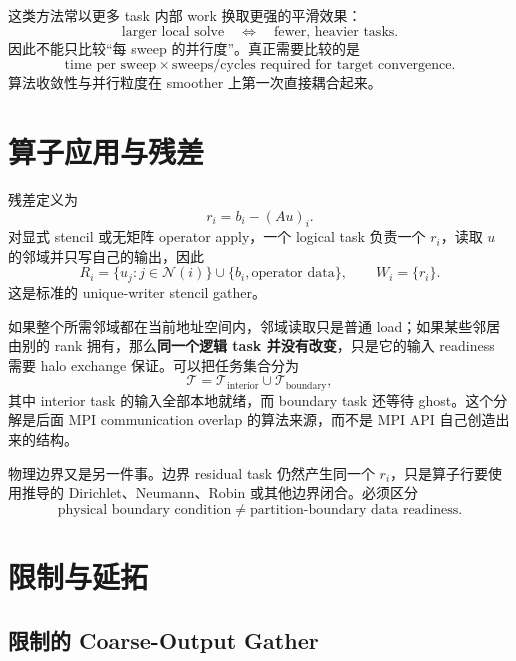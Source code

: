 这类方法常以更多 task 内部 work 换取更强的平滑效果：
\begin{equation}
\text{larger local solve}
\quad\Longleftrightarrow\quad
\text{fewer, heavier tasks}.
\end{equation}
因此不能只比较“每 sweep 的并行度”。真正需要比较的是
\begin{equation}
\boxed{
\text{time per sweep}
\times
\text{sweeps/cycles required for target convergence}.
}
\end{equation}
算法收敛性与并行粒度在 smoother 上第一次直接耦合起来。

\section{算子应用与残差}

残差定义为
\begin{equation}
r_i=b_i-(Au)_i.
\end{equation}
对显式 stencil 或无矩阵 operator apply，一个 logical task 负责一个 $r_i$，读取 $u$ 的邻域并只写自己的输出，因此
\begin{equation}
R_i=
\{u_j:j\in\mathcal N(i)\}
\cup
\{b_i,\text{operator data}\},
\qquad
W_i=\{r_i\}.
\end{equation}
这是标准的 unique-writer stencil gather。

如果整个所需邻域都在当前地址空间内，邻域读取只是普通 load；如果某些邻居由别的 rank 拥有，那么\textbf{同一个逻辑 task 并没有改变}，只是它的输入 readiness 需要 halo exchange 保证。可以把任务集合分为
\begin{equation}
\mathcal T
=
\mathcal T_{\mathrm{interior}}
\cup
\mathcal T_{\mathrm{boundary}},
\end{equation}
其中 interior task 的输入全部本地就绪，而 boundary task 还等待 ghost。这个分解是后面 MPI communication overlap 的算法来源，而不是 MPI API 自己创造出来的结构。

物理边界又是另一件事。边界 residual task 仍然产生同一个 $r_i$，只是算子行要使用推导的 Dirichlet、Neumann、Robin 或其他边界闭合。必须区分
\begin{equation}
\boxed{
\text{physical boundary condition}
\neq
\text{partition-boundary data readiness}.
}
\end{equation}

\section{限制与延拓}

\subsection{限制的 Coarse-Output Gather}

